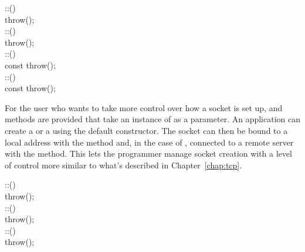 \begin{inlinefcn}
 ::()\\
\hspace*{2in} throw();\\
::()\\
\hspace*{2in}throw();\\
 ::()\\
\hspace*{2in} const throw();\\
 ::()\\
\hspace*{2in} const throw();\\ 
\end{inlinefcn}

For the user who wants to take more control over how a socket is set
up,  and  methods are provided that
take an instance of  as a parameter.  An
application can create a  or a 
using the default constructor.  The socket can then be bound to a
local address with the  method and, in the case of
, connected to a remote server with the
 method.  This lets the programmer manage socket
creation with a level of control more similar to what's described in
Chapter~\ref{chap:tcp}.

\begin{inlinefcn}
 ::()\\
\hspace*{2in} throw();\\
 ::()\\
\hspace*{2in} throw();\\
 ::()\\
\hspace*{2in} throw();\\
\end{inlinefcn}

